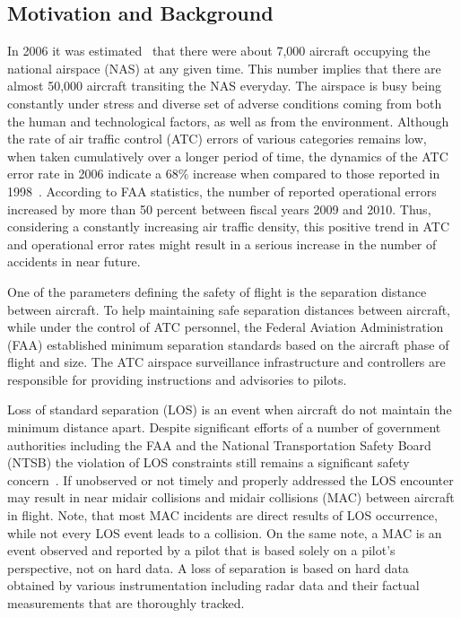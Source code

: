 \documentclass[letter,onecolumn,12pt]{aiaa-tc}
\newcommand{\1}{1_n}
\begin{document}
\subsection{Motivation and Background}
In 2006 it was estimated~\cite{FAA_ATO_2006} that there were about 7,000 aircraft occupying the national airspace (NAS) at any given time. This number implies that there are almost 50,000 aircraft transiting the NAS everyday. The airspace is busy being constantly under stress and diverse set of adverse conditions coming from both the human and technological factors, as well as from the environment. Although the rate of air traffic control (ATC) errors of various categories remains low,  when taken cumulatively over a longer period of time, the dynamics of the ATC error rate in 2006 indicate a $68\%$  increase when compared to those reported in 1998~\cite{USAToday_2006}. According to FAA statistics, the number of reported operational errors increased by more than 50 percent between fiscal years 2009 and 2010. Thus, considering a constantly increasing air traffic density, this positive trend in ATC and operational error rates might result in a serious increase in the number of accidents in near future.

One of the parameters defining the safety of flight is the separation distance between aircraft. To help maintaining safe separation distances between aircraft, while under the control of ATC personnel, the Federal Aviation Administration (FAA) established minimum separation standards based on the aircraft phase of flight and size. The ATC airspace surveillance infrastructure and controllers are responsible for providing instructions and advisories to pilots.

Loss of standard separation (LOS) is an event when aircraft do not maintain the minimum distance apart. Despite significant efforts of a number of government authorities including the FAA and the National Transportation Safety Board (NTSB) the violation of LOS constraints still remains a significant safety concern~\cite{OIG_AR2013}. If unobserved or not timely and properly addressed the LOS encounter may result in near midair collisions and midair collisions (MAC) between aircraft in flight. Note, that most MAC incidents are direct results of LOS occurrence, while not every LOS event leads to a collision. On the same note, a MAC is an event observed and reported by a pilot that is based solely on a pilot's perspective, not on hard data. A loss of separation is based on hard data obtained by various instrumentation including radar data and their factual measurements that are thoroughly tracked.
\end{document}
